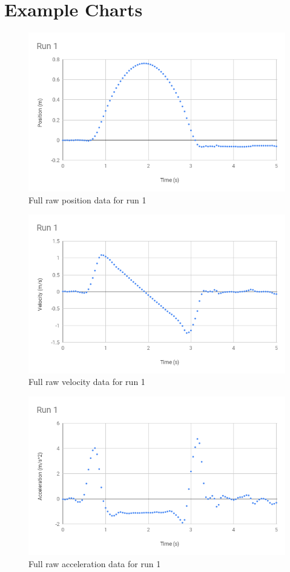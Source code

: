 \section{Example Charts}
%
\begin{figure}[ht]
    \centering
    \includegraphics[scale=0.71]{image/02-incline/Run1-d.png}
    \caption{Full raw position data for run 1}
    \label{figure:02.raw.d}
\end{figure}
%
\begin{figure}[ht]
    \centering
    \includegraphics[scale=0.71]{image/02-incline/Run1-v.png}
    \caption{Full raw velocity data for run 1}
    \label{figure:02.raw.v}
\end{figure}
%
\begin{figure}[ht]
    \centering
    \includegraphics[scale=0.71]{image/02-incline/Run1-a.png}
    \caption{Full raw acceleration data for run 1}
    \label{figure:02.raw.a}
\end{figure}
